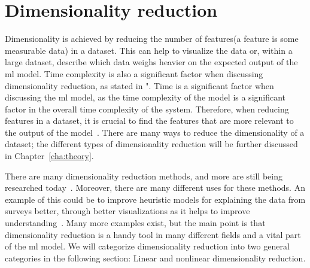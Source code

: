 

\section{Dimensionality reduction}\label{sec:dimensionality-reduction-problem}
Dimensionality is achieved by reducing the number of features(a feature is some measurable data) in a dataset. This can help to visualize the data or, within a large dataset, describe which data weighs heavier on the expected output of the \gls{ml} model. Time complexity is also a significant factor when discussing dimensionality reduction, as stated in ". Time is a significant factor when discussing the \gls{ml} model, as the time complexity of the model is a significant factor in the overall time complexity of the system. Therefore, when reducing features in a dataset, it is crucial to find the features that are more relevant to the output of the model~\cite{Feature-engineering-zheng}. There are many ways to reduce the dimensionality of a dataset; the different types of dimensionality reduction will be further discussed in Chapter~\ref{cha:theory}.

There are many dimensionality reduction methods, and more are still being researched today~\cite{dimensionality-reduction-cheng}. Moreover, there are many different uses for these methods. An example of this could be to improve heuristic models for explaining the data from surveys better, through better visualizations as it helps to improve understanding~\cite{dimensionality-reduction-cheng}. Many more examples exist, but the main point is that dimensionality reduction is a handy tool in many different fields and a vital part of the \gls{ml} model. We will categorize dimensionality reduction into two general categories in the following section: Linear and nonlinear dimensionality reduction. 
